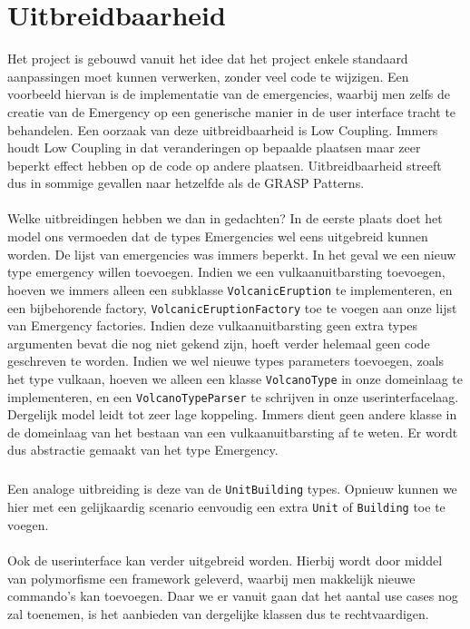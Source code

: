\documentclass[a4paper, titlepage,12pt]{article}
\begin{document}
\section{Uitbreidbaarheid}
\label{uitbreidbaarheid}
Het project is gebouwd vanuit het idee dat het project enkele standaard aanpassingen moet kunnen verwerken, zonder veel code te wijzigen. Een voorbeeld hiervan is de implementatie van de emergencies, waarbij men zelfs de creatie van de Emergency op een generische manier in de user interface tracht te behandelen. Een oorzaak van deze uitbreidbaarheid is Low Coupling. Immers houdt Low Coupling in dat veranderingen op bepaalde plaatsen maar zeer beperkt effect hebben op de code op andere plaatsen. Uitbreidbaarheid streeft dus in sommige gevallen naar hetzelfde als de GRASP Patterns.
\paragraph{}
Welke uitbreidingen hebben we dan in gedachten? In de eerste plaats doet het model ons vermoeden dat de types Emergencies wel eens uitgebreid kunnen worden. De lijst van emergencies was immers beperkt. In het geval we een nieuw type emergency willen toevoegen. Indien we een vulkaanuitbarsting toevoegen, hoeven we immers alleen een subklasse \verb+VolcanicEruption+ te implementeren, en een bijbehorende factory, \verb+VolcanicEruptionFactory+ toe te voegen aan onze lijst van Emergency factories. Indien deze vulkaanuitbarsting geen extra types argumenten bevat die nog niet gekend zijn, hoeft verder helemaal geen code geschreven te worden. Indien we wel nieuwe types parameters toevoegen, zoals het type vulkaan, hoeven we alleen een klasse \verb+VolcanoType+ in onze domeinlaag te implementeren, en een \verb+VolcanoTypeParser+ te schrijven in onze userinterfacelaag. Dergelijk model leidt tot zeer lage koppeling. Immers dient geen andere klasse in de domeinlaag van het bestaan van een vulkaanuitbarsting af te weten. Er wordt dus abstractie gemaakt van het type Emergency.
\subparagraph{}
Een analoge uitbreiding is deze van de \verb+UnitBuilding+ types. Opnieuw kunnen we hier met een gelijkaardig scenario eenvoudig een extra \verb+Unit+ of \verb+Building+ toe te voegen.
\paragraph{}
Ook de userinterface kan verder uitgebreid worden. Hierbij wordt door middel van polymorfisme een framework geleverd, waarbij men makkelijk nieuwe commando's kan toevoegen. Daar we er vanuit gaan dat het aantal use cases nog zal toenemen, is het aanbieden van dergelijke klassen dus te rechtvaardigen.
\newpage
\end{document}
